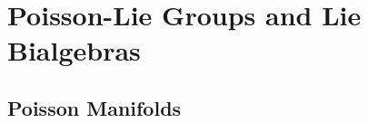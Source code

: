 \documentclass[openany, a5paper]{book}
\begin{document}





\tableofcontents

\mainmatter

\chapter{Poisson-Lie Groups and Lie Bialgebras}
\section{Poisson Manifolds}
\end{document}
